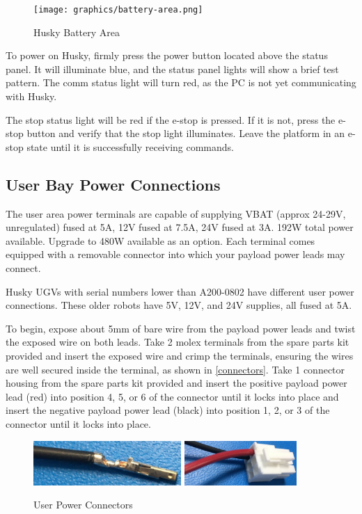 \documentclass[]{clearpath-latex/clearpath-manual}
\begin{document}
\begin{figure}[h]
	\centering
	\texttt{[image: graphics/battery-area.png]}
	\caption{Husky Battery Area}
	\label{battery-area}
\end{figure}

To power on Husky, firmly press the power button located above the status panel. It will illuminate blue, and the
status panel lights will show a brief test pattern. The comm status light will turn red, as the PC is not yet
communicating with Husky.

The stop status light will be red if the e-stop is pressed. If it is not, press the e-stop button and
verify that the stop light illuminates. Leave the platform in an e-stop state until it is successfully receiving commands.

\subsection{User Bay Power Connections}
The user area power terminals are capable of supplying VBAT (approx 24-29V, unregulated) fused at 5A, 12V fused at 7.5A,
24V fused at 3A. 192W total power available. Upgrade to 480W available as an option. Each terminal comes equipped with a
removable connector into which your payload power leads may connect.

Husky UGVs with serial numbers lower than A200-0802 have different user power connections.  These older robots have
5V, 12V, and 24V supplies, all fused at 5A.

To begin, expose about 5mm of bare wire from the payload power leads and twist the exposed wire on both leads.  Take 2 molex terminals from the spare parts kit provided and insert the exposed wire and crimp the terminals, ensuring the wires are well secured inside the terminal, as shown in \autoref{connectors}. Take 1 connector housing from the spare parts kit provided and insert the positive payload power lead (red) into position 4, 5, or 6 of the connector until it locks into place and insert the negative payload power lead (black) into position 1, 2, or 3 of the connector until it locks into place.

\begin{figure}[h]
	\centering
	\includegraphics[width=0.5\textwidth]{graphics/updated-power-connector-1.jpg}
	\includegraphics[width=0.38\textwidth]{graphics/updated-power-connector-2.jpg}
	\caption{User Power Connectors}
	\label{connectors}
\end{figure}
\end{document}
